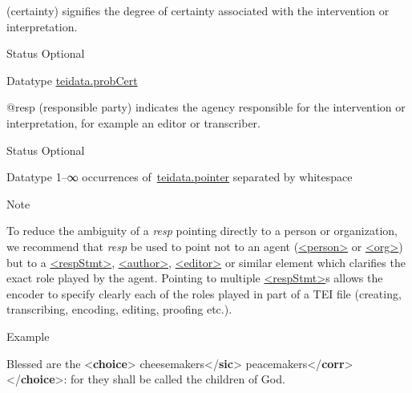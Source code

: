 \begin{reflist}
\begin{sansreflist}
  (certainty) signifies the degree of certainty associated with the intervention or interpretation.
\begin{reflist}
    \item[{Status}]
  Optional
    \item[{Datatype}]
  \hyperref[TEI.teidata.probCert]{teidata.probCert}
\end{reflist}  
    \item[@resp]
  (responsible party) indicates the agency responsible for the intervention or interpretation, for example an editor or transcriber.
\begin{reflist}
    \item[{Status}]
  Optional
    \item[{Datatype}]
  1–∞ occurrences of \hyperref[TEI.teidata.pointer]{teidata.pointer} separated by whitespace
    \item[{Note}]
  \par
To reduce the ambiguity of a {\itshape resp} pointing directly to a person or organization, we recommend that {\itshape resp} be used to point not to an agent (\hyperref[TEI.person]{<person>} or \hyperref[TEI.org]{<org>}) but to a \hyperref[TEI.respStmt]{<respStmt>}, \hyperref[TEI.author]{<author>}, \hyperref[TEI.editor]{<editor>} or similar element which clarifies the exact role played by the agent. Pointing to multiple \hyperref[TEI.respStmt]{<respStmt>}s allows the encoder to specify clearly each of the roles played in part of a TEI file (creating, transcribing, encoding, editing, proofing etc.).
\end{reflist}  
\end{sansreflist}  
    \item[{Example}]
  \leavevmode\bgroup{}\exampleFont \begin{shaded}\noindent\mbox{}Blessed are the\mbox{}\newline 
{<\textbf{choice}>}\mbox{}\newline 
{}cheesemakers{</\textbf{sic}>}\mbox{}\newline 
{}peacemakers{</\textbf{corr}>}\mbox{}\newline 
{</\textbf{choice}>}: for they shall be called the children of God.\end{shaded}\egroup 



\end{reflist}

